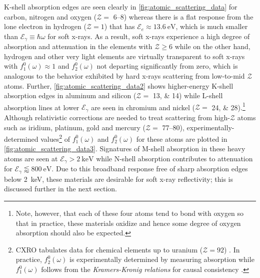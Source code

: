 K-shell absorption edges are seen clearly in \cref{fig:atomic_scattering_data} for carbon, nitrogen and oxygen ($\mathcal{Z}=$ \numrange{6}{8}) whereas there is a flat response from the lone electron in hydrogen ($\mathcal{Z}=1$) that has $\mathcal{E}_e \approx \SI{13.6}{\electronvolt}$, which is much smaller than $\mathcal{E}_{\gamma} \equiv \hbar \omega$ for soft x-rays.
As a result, soft x-rays experience a high degree of absorption and attenuation in the elements with $\mathcal{Z} \geq 6$ while on the other hand, hydrogen and other very light elements are virtually transparent to soft x-rays with $f_1^0(\omega) \approx 1$ and $f_2^0(\omega)$ not departing significantly from zero, which is analogous to the behavior exhibited by hard x-rays scattering from low-to-mid $\mathcal{Z}$ atoms. 
Further, \cref{fig:atomic_scattering_data2} shows higher-energy K-shell absorption edges in aluminum and silicon ($\mathcal{Z}=$ \numlist{13;14}) while L-shell absorption lines at lower $\mathcal{E}_{\gamma}$ are seen in chromium and nickel ($\mathcal{Z}=$ \numlist{24;28}).\footnote{Note, however, that each of these four atoms tend to bond with oxygen so that in practice, these materials oxidize and hence some degree of oxygen absorption should also be expected.}
Although relativistic corrections are needed to treat scattering from high-$\mathcal{Z}$ atoms such as iridium, platinum, gold and mercury ($\mathcal{Z}=$ \numrange{77}{80}), experimentally-determined values\footnote{CXRO tabulates data for chemical elements up to uranium ($\mathcal{Z} = 92$) \cite{Henke93,Gullikson98,CXRO_database,Attwood17}. In practice, $f_2^0(\omega)$ is experimentally determined by measuring absorption while $f_1^0(\omega)$ follows from the \emph{Kramers-Kronig relations} for causal consistency \cite{Kronig26,Als-Nielsen11,Attwood17,Jackson75,Landau60}.} of $f_1^0(\omega)$ and $f_2^0(\omega)$ for these atoms are plotted in \cref{fig:atomic_scattering_data3}. 
Signatures of M-shell absorption in these heavy atoms are seen at $\mathcal{E}_{\gamma} > \SI{2}{\kilo\electronvolt}$ while N-shell absorption contributes to attenuation for $\mathcal{E}_{\gamma} \lessapprox \SI{800}{\electronvolt}$. 
Due to this broadband response free of sharp absorption edges below \SI{2}{\kilo\electronvolt}, these materials are desirable for soft x-ray reflectivity; this is discussed further in the next section. %

